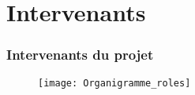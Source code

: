 \section{Intervenants}
\begin{frame}
  \frametitle{\color{white} Intervenants du projet}
  \begin{figure}[p]
    \centering
    \texttt{[image: Organigramme\_roles]}
  \end{figure}
\end{frame}
